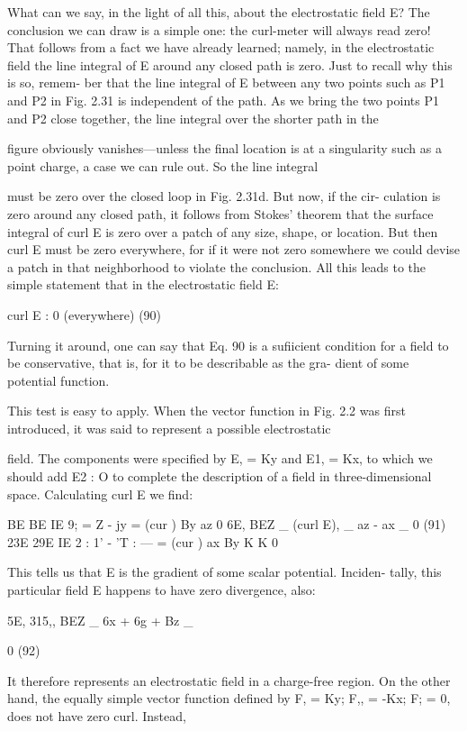 {What can we say, in the light of all this, about the electrostatic
field E? The conclusion we can draw is a simple one: the curl-meter
will always read zero! That follows from a fact we have already
learned; namely, in the electrostatic field the line integral of E
around any closed path is zero. Just to recall why this is so, remem-
ber that the line integral of E between any two points such as P1 and
P2 in Fig. 2.31 is independent of the path. As we bring the two points
P1 and P2 close together, the line integral over the shorter path in the

figure obviously vanishes---unless the final location is at a singularity
such as a point charge, a case we can rule out. So the line integral

must be zero over the closed loop in Fig. 2.31d. But now, if the cir-
culation is zero around any closed path, it follows from Stokes'
theorem that the surface integral of curl E is zero over a patch of any
size, shape, or location. But then curl E must be zero everywhere,
for if it were not zero somewhere we could devise a patch in that
neighborhood to violate the conclusion. All this leads to the simple
statement that in the electrostatic field E:

curl E : 0 (everywhere) (90)

Turning it around, one can say that Eq. 90 is a sufiicient condition for
a field to be conservative, that is, for it to be describable as the gra-
dient of some potential function.

This test is easy to apply. When the vector function in Fig. 2.2
was first introduced, it was said to represent a possible electrostatic

field. The components were specified by E, = Ky and E1, = Kx, to
which we should add E2 : O to complete the description of a field
in three-dimensional space. Calculating curl E we find:

BE BE
IE 9; = Z - jy =
(cur ) By az 0
6E, BEZ _
(curl E), _ az - ax _ 0 (91)
23E 29E
IE 2 : 1' - 'T : --- =
(cur ) ax By K K 0

This tells us that E is the gradient of some scalar potential. Inciden-
tally, this particular field E happens to have zero divergence, also:

5E, 315,, BEZ _
6x + 6g + Bz _

0 (92)

It therefore represents an electrostatic field in a charge-free region.
On the other hand, the equally simple vector function defined by
F, = Ky; F,, = -Kx; F; = 0, does not have zero curl. Instead,

}

